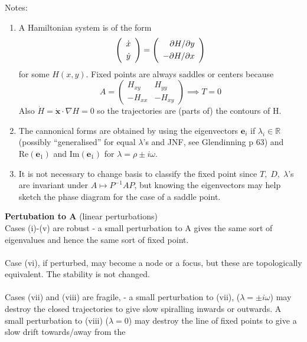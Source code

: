 \documentclass{article}
\begin{document}
%
Notes:
\begin{enumerate}[(1)]
\item A Hamiltonian system is of the form
\[ \left( \begin{array}{c} \dot{x} \vspace{1mm}\\ \dot{y} \end{array} \right) =
\left( \begin{array}{r} \partial H / \partial y \vspace{1mm}\\ - \partial H / \partial x \end{array} \right) \]
for some $H(x,y)$. Fixed points are always saddles or centers because
\[ A = \left( \begin{array}{rr} H_{xy} & H_{yy} \\ -H_{xx} & -H_{xy} \end{array} \right) \implies T = 0 \]
Also $\dot{H} = \dot{\bm{x}}\cdot \nabla H = 0$ so the trajectories are
 (parts of) the contours of H.

\item The cannonical forms are obtained by using the eigenvectors $\bm{e}_i$ if
$\lambda _ i \in \mathbb{R}$ (possibly ``generalised'' for equal $\lambda$'s
and JNF, see Glendinning p 63) and $\mathrm{Re}(\bm{e}_1)$ and $\mathrm{Im}(\bm{e}_1)$ for 
$\lambda = \rho \pm i \omega$.

\item It is not necessary to change basis to classify the fixed point since
$T, \; D, \; \lambda$'s are invariant under $A \mapsto P^{-1}AP$, but knowing 
the eigenvectors may help sketch the phase diagram for the case of a saddle 
point.
\end{enumerate}
%
\textbf{Pertubation to A} (linear perturbations) 
\\
Cases (i)-(v) are robust - a small perturbation to A gives the same sort of 
eigenvalues and hence the same sort of fixed point.
\\
\\
Case (vi), if perturbed, may become a node or a focus, but these are 
topologically equivalent. The stability is not changed.
\\
\\
Cases (vii) and (viii) are fragile, - a small perturbation to (vii),
($\lambda = \pm i \omega$) may destroy the closed trajectories to give slow
spiralling inwards or outwards. A small perturbation to (viii) ($\lambda = 0$) 
may destroy the line of fixed points to give a slow drift towards/away from the
\end{document}
